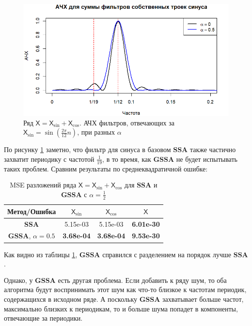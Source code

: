 \documentclass[a4paper, 11pt]{article}
\newcommand{\SSA}{\textbf{SSA}}
\newcommand{\GSSA}{\textbf{GSSA}}
\newcommand{\TS}{\mathsf{X}}
\begin{document}
\begin{figure}[H]
	\centering
	\includegraphics[width=1\textwidth]{img/various_alphas_sin_cos.png}
	\caption{Ряд $\TS = \TS_{\sin} + \TS_{\cos}$. АЧХ фильтров, отвечающих за $\TS_{\sin} = \sin\left(\frac{2\pi}{12} n \right)$, при разных $\alpha$}
	\label{fig:various_alphas_sin_cos}
\end{figure}

По рисунку \ref{fig:various_alphas_sin_cos} заметно, что фильтр для синуса в базовом $\SSA$ также частично захватит периодику с частотой $\frac{1}{19}$, в то время, как $\GSSA$ не будет испытывать таких проблем. Сравним результаты по среднеквадратичной ошибке:

\begin{table}[H]
	\caption{MSE разложений ряда $\TS = \TS_{\sin} + \TS_{\cos}$ для $\SSA$ и $\GSSA$ с $\alpha = \frac{1}{2}$}
	\centering
	\begin{tabular}{c|ccc}
		\hline
		Метод/Ошибка & $\TS_{\sin}$ & $\TS_{\cos}$ & $\TS$ \\ 
		\hline
		\textbf{SSA}   & 5.15e-03 & 5.15e-03 & \textbf{6.01e-30}\\ 
		\textbf{GSSA}, $\alpha = 0.5$  & \textbf{3.68e-04} & \textbf{3.68e-04} & \textbf{9.53e-30} \\ 
		\hline
	\end{tabular}
	
	\label{tab:mse_ssa_gssa}
\end{table}

Как видно из таблицы \ref{tab:mse_ssa_gssa}, $\GSSA$ справился с разделением на порядок лучше $\SSA$.

Однако, у $\GSSA$ есть другая проблема. Если добавить к ряду шум, то оба алгоритма будут воспринимать этот шум как что-то близкое к частотам периодик, содержащихся в исходном ряде. А поскольку $\GSSA$ захватывает больше частот, максимально близких к периодикам, то и больше шума попадет в компоненты, отвечающие за периодики.
\end{document}
